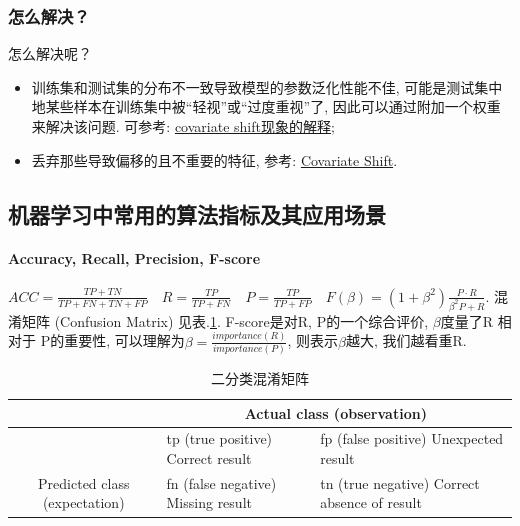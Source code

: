 \subsubsection{怎么解决？}
怎么解决呢？
\begin{itemize}
	\item 训练集和测试集的分布不一致导致模型的参数泛化性能不佳, 可能是测试集中地某些样本在训练集中被“轻视”或“过度重视”了, 因此可以通过附加一个权重来解决该问题. 可参考: \href{https://blog.csdn.net/mao_xiao_feng/article/details/54317852}{covariate shift现象的解释}; 
	\item 丢弃那些导致偏移的且不重要的特征, 参考: \href{https://zhuanlan.zhihu.com/p/205183444}{Covariate Shift}. 
\end{itemize}

\subsection{机器学习中常用的算法指标及其应用场景}

\paragraph{Accuracy, Recall, Precision, F-score}

$ACC = \frac{TP + TN}{TP+FN+TN+FP}\quad R = \frac{TP}{TP+FN}\quad P = \frac{TP}{TP+FP}\quad F(\beta) = (1 + \beta^2)\frac{P \cdot R}{\beta^2 P + R}$. 混淆矩阵 (Confusion Matrix) 见表.\ref{tab:confusion_mat}. F-score是对R, P的一个综合评价, $\beta$度量了R 相对于 P的重要性, 可以理解为$\beta = \frac{importance(R) }{importance(P)}$, 则表示$\beta$越大, 我们越看重R. 

\begin{table}[h]
	\centering
	\caption{二分类混淆矩阵}
	\label{tab:confusion_mat}
	\begin{tabular}{|c|l|l|}
		\hline
		\multicolumn{1}{|l|}{}                          & \multicolumn{2}{c|}{Actual class (observation)}                                                                                   \\ \hline
		& tp (true positive) Correct result                          & fp (false positive) Unexpected result                                \\ \cline{2-3} 
		\multirow{-2}{*}{Predicted class (expectation)} & \cellcolor[HTML]{68CBD0}fn (false negative) Missing result & \cellcolor[HTML]{68CBD0}tn (true negative) Correct absence of result \\ \hline
	\end{tabular}
\end{table}

